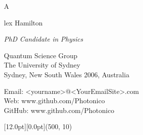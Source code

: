 \documentclass[12pt,a4paper]{report}
\newcommand{\namefont}[1]{{\normalfont\bfseries\Huge{#1}}}
\newcommand{\myname}{Alex Hamilton}
\newcommand{\mydegree}{PhD Candidate in Physics}
\begin{document}
    \begin{center}
        \begin{minipage}[t]{240pt}
                \vspace{0pt}
                \namefont{\centerline\myname}
        \end{minipage}
        \begin{minipage}[t]{240pt}
            \vspace{0pt}
            {\em{\mydegree}} \par
        \end{minipage}
    \end{center}
    \begin{center}
        \begin{minipage}[t]{240pt}
            \begin{flushleft}
                \vspace{0pt}
                \quad Quantum Science Group \\
                \quad The University of Sydney \\
                \quad Sydney, New South Wales 2006, Australia \\
            \end{flushleft}
        \end{minipage}
        \begin{minipage}[t]{240pt}
            \begin{flushleft}
                \vspace{0pt}
                    Email: \textless yourname\textgreater @\textless YourEmailSite\textgreater.com \\
                    Web: www.github.com/Photonico \\
                    GitHub: www.github.com/Photonico \\
            \end{flushleft}
        \end{minipage}
    \end{center}
    \begin{center}\begin{minipage}[t]{512pt}
        \colorbox{subtitlecolor}{\raisebox{0pt}[12.0pt][0.0pt]{\makebox(500, 10){
            \textcolor{white}{\ttfamily{}\selectfont{}}}}}\end{minipage}\end{center}
\end{document}
